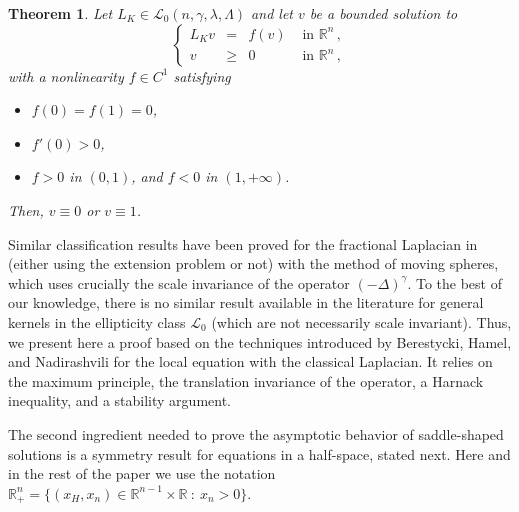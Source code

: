 \documentclass[12pt,reqno]{amsart}
\newtheorem{theorem}{Theorem}[section]
\theoremstyle{definition}
\theoremstyle{remark}
\newcommand{\con}[1]{\mathbb{#1}}
\newcommand{\R}{\con{R}} %
\newcommand{\lcal}{\mathcal{L}}
\newcommand{\s}{\gamma}
\newcommand{\fraclaplacian}{(-\Delta)^\s}
\newcommand\beqc[1]{\left\{\begin{array}{#1}}
\newcommand\eeqc{\end{array} \right.}
\def\PDEsystem{rcll}
\numberwithin{equation}{section}
\begin{document}
\begin{theorem}
	\label{Th:LiouvilleSemilinearWholeSpace}
	Let $L_K \in \lcal_0(n,\s,\lambda, \Lambda)$ and let $v$ be a bounded solution to
	\begin{equation}
	\label{Eq:PositiveWholeSpace}
	\beqc{\PDEsystem}
	L_K v &=& f(v) & \textrm{ in }\R^n\,,\\
	v &\geq& 0 & \textrm{ in } \R^n\,,
	\eeqc
	\end{equation}
	with a nonlinearity $f\in C^1$ satisfying
	\begin{itemize}
		\item $f(0) = f(1) = 0$,
		\item $f'(0)>0$,
		\item $f>0$ in $(0,1)$, and $f<0$ in $(1,+\infty)$.
	\end{itemize}
	Then, $v\equiv 0$ or $v \equiv 1$.
\end{theorem}

Similar classification results have been proved for the fractional Laplacian in \cite{ChenLiZhang,LiZhang} (either using the extension problem or not) with the method of moving spheres, which uses crucially the scale invariance of the operator $\fraclaplacian$. To the best of our knowledge, there is no similar result available in the literature for general kernels in the ellipticity class $\lcal_0$ (which are not necessarily scale invariant). Thus, we present here a proof based on the techniques introduced by Berestycki, Hamel, and Nadirashvili \cite{BerestyckiHamelNadi} for the local equation with the classical Laplacian. It relies on the maximum principle, the translation invariance of the operator, a Harnack inequality, and a stability argument.

The second ingredient needed to prove the asymptotic behavior of saddle-shaped solutions is a symmetry result for equations in a half-space, stated next. Here and in the rest of the paper we use the notation $\R^n_+= \{(x_H,x_n)\in \R^{n-1}\times \R \ : \ x_n > 0\}$.  
\end{document}

